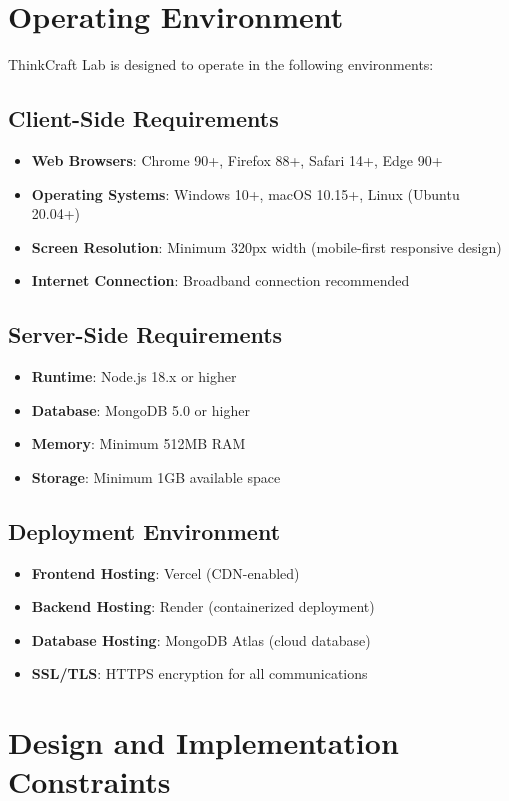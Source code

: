 \documentclass{scrreprt}
\begin{document}
\section{Operating Environment}
ThinkCraft Lab is designed to operate in the following environments:

\subsection{Client-Side Requirements}
\begin{itemize}
\item \textbf{Web Browsers}: Chrome 90+, Firefox 88+, Safari 14+, Edge 90+
\item \textbf{Operating Systems}: Windows 10+, macOS 10.15+, Linux (Ubuntu 20.04+)
\item \textbf{Screen Resolution}: Minimum 320px width (mobile-first responsive design)
\item \textbf{Internet Connection}: Broadband connection recommended
\end{itemize}

\subsection{Server-Side Requirements}
\begin{itemize}
\item \textbf{Runtime}: Node.js 18.x or higher
\item \textbf{Database}: MongoDB 5.0 or higher
\item \textbf{Memory}: Minimum 512MB RAM
\item \textbf{Storage}: Minimum 1GB available space
\end{itemize}

\subsection{Deployment Environment}
\begin{itemize}
\item \textbf{Frontend Hosting}: Vercel (CDN-enabled)
\item \textbf{Backend Hosting}: Render (containerized deployment)
\item \textbf{Database Hosting}: MongoDB Atlas (cloud database)
\item \textbf{SSL/TLS}: HTTPS encryption for all communications
\end{itemize}

\section{Design and Implementation Constraints}
\end{document}
